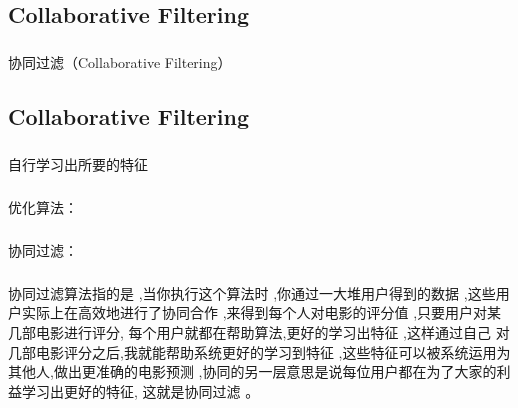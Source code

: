 \documentclass{article}
\begin{document}
\begin{CJK}{UTF8}{gbsn}
\section{Collaborative Filtering}
\subparagraph{}
协同过滤（Collaborative Filtering）
\subsection{Collaborative Filtering}
\subparagraph{}
自行学习出所要的特征
\begin{figure}[H]
\label{fig:999}
\end{figure}
\begin{figure}[H]
\label{fig:9991}
\end{figure}
\begin{figure}[H]
\label{fig:9992}
\end{figure}
\subparagraph{}
优化算法：
\begin{figure}[H]
\label{fig:9993}
\end{figure}
\begin{figure}[H]
\label{fig:9994}
\end{figure}
\subparagraph{}
协同过滤：
\begin{figure}[H]
\label{fig:9995}
\end{figure}
\subparagraph{}
协同过滤算法指的是 ,当你执行这个算法时 ,你通过一大堆用户得到的数据 ,这些用户实际上在高效地进行了协同合作 ,来得到每个人对电影的评分值 ,只要用户对某几部电影进行评分, 每个用户就都在帮助算法,更好的学习出特征 ,这样通过自己 对几部电影评分之后,我就能帮助系统更好的学习到特征 ,这些特征可以被系统运用为其他人,做出更准确的电影预测 ,协同的另一层意思是说每位用户都在为了大家的利益学习出更好的特征, 这就是协同过滤 。

\end{CJK}
\end{document}

